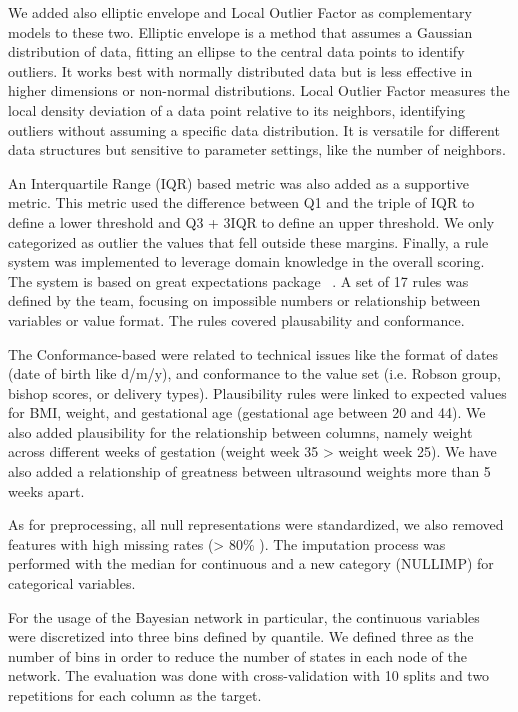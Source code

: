 We added also elliptic envelope and Local Outlier Factor as complementary models to these two. Elliptic envelope is a method that assumes a Gaussian distribution of data, fitting an ellipse to the central data points to identify outliers. It works best with normally distributed data but is less effective in higher dimensions or non-normal distributions. Local Outlier Factor measures the local density deviation of a data point relative to its neighbors, identifying outliers without assuming a specific data distribution. It is versatile for different data structures but sensitive to parameter settings, like the number of neighbors. 

An Interquartile Range (IQR) based metric was also added as a supportive metric. This metric used the difference between Q1 and the triple of IQR  to define a lower threshold and Q3 + 3IQR to define an upper threshold. We only categorized as outlier the values that fell outside these margins. Finally, a rule system was implemented to leverage domain knowledge in the overall scoring. The system is based on great expectations package \unskip~\cite{GXProactiveCollaborative}. A set of 17 rules was defined by the team, focusing on impossible numbers or relationship between variables  or value format. The rules covered plausability and conformance. 

The Conformance-based were related to technical issues like the format of dates (date of birth like d/m/y), and conformance to the value set (i.e. Robson group, bishop scores, or delivery types). Plausibility rules were linked to expected values for BMI, weight, and gestational age (gestational age between 20 and 44). We also added plausibility for the relationship between columns, namely weight across different weeks of gestation (weight week 35 {\textgreater} weight week 25). We have also added a relationship of greatness between ultrasound weights more than 5 weeks apart. 

As for preprocessing, all null representations were standardized, we also removed features with high missing rates ({\textgreater} 80\% ). The imputation process was performed with the median for continuous and a new category (NULLIMP) for categorical variables.

For the usage of the Bayesian network in particular, the continuous variables were discretized into three bins defined by quantile. We defined three as the number of bins in order to reduce the number of states in each node of the network. The evaluation was done with cross-validation with 10 splits and two repetitions for each column as the target.


